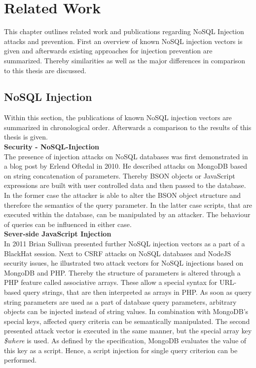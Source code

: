\chapter{Related Work}
This chapter outlines related work and publications regarding NoSQL Injection attacks and prevention. First an overview of known NoSQL injection vectors is given and afterwards existing approaches for injection prevention are summarized. Thereby similarities as well as the major differences in comparison to this thesis are discussed.

\section{NoSQL Injection}
Within this section, the publications of known NoSQL injection vectors are summarized in chronological order. Afterwards a comparison to the results of this thesis is given. \\

\textbf{Security - NoSQL-Injection}\cite{Oftedal:2010} \\
The presence of injection attacks on NoSQL databases was first demonstrated in a blog post by Erlend Oftedal in 2010. He described attacks on MongoDB based on string concatenation of parameters. Thereby BSON objects or JavaScript expressions are built with user controlled data and then passed to the database. In the former case the attacker is able to alter the BSON object structure and therefore the semantics of the query parameter. In the latter case scripts, that are executed within the database, can be manipulated by an attacker. The behaviour of queries can be influenced in either case. \\

\textbf{Sever-side JavaScript Injection}\cite{Sullivan:2011} \\
In 2011 Brian Sullivan presented further NoSQL injection vectors as a part of a BlackHat session. Next to CSRF attacks on NoSQL databases and NodeJS security issues, he illustrated two attack vectors for NoSQL injections based on MongoDB and PHP. Thereby the structure of parameters is altered through a PHP feature called associative arrays. These allow a special syntax for URL-based query strings, that are then interpreted as arrays in PHP. As soon as query string parameters are used as a part of database query parameters, arbitrary objects can be injected instead of string values. In combination with MongoDB's special keys, affected query criteria can be semantically manipulated. The second presented attack vector is executed in the same manner, but the special array key \textit{\$where} is used. As defined by the specification, MongoDB evaluates the value of this key as a script. Hence, a script injection for single query criterion can be performed. \\

